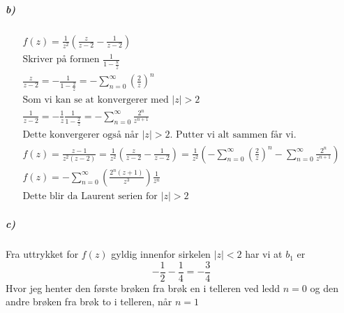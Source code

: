 \documentclass[11pt, A4paper,norsk]{article}
\begin{document}
			\subparagraph{b)}
				\begin{gather*}
f(z) = \frac{1}{z^2}\left( \frac{z}{z - 2} - \frac{1}{z - 2} \right) \\
\text{Skriver på formen $\frac{1}{1 - \frac{k}{z}}$} \\
\frac{z}{z - 2} = - \frac{1}{1 - \frac{2}{z}} = - \sum_{n = 0}^{\infty} \left( \frac{2}{z} \right)^n \\
\text{Som vi kan se at konvergerer med $|z| > 2$} \\
\frac{1}{z - 2} = - \frac{1}{z} \frac{1}{1 - \frac{2}{z}} = - \sum_{n = 0}^{\infty} \frac{2^{n}}{z^{n + 1}} \\
\text{Dette konvergerer også når $|z| > 2$. Putter vi alt sammen får vi.} \\
f(z) = \frac{z - 1}{z^2(z - 2)} = \frac{1}{z^2} \left( \frac{z}{z - 2} - \frac{1}{z - 2} \right) = \frac{1}{z^2} \left( - \sum_{n = 0}^{\infty} \left( \frac{2}{z} \right)^n - \sum_{n = 0}^{\infty} \frac{2^n}{z^{n + 1}} \right) \\
f(z) = - \sum_{n = 0}^{\infty} \left( \frac{2^n(z + 1)}{z^3} \right)\frac{1}{z^n} \\
\text{Dette blir da Laurent serien for $|z| > 2$}
				\end{gather*}









			\subparagraph{c)}
				\begin{flushleft}
Fra uttrykket for $f(z)$ gyldig innenfor sirkelen $|z| < 2$ har vi at $b_1$ er 
$$- \frac{1}{2} - \frac{1}{4} = - \frac{3}{4}$$
Hvor jeg henter den første brøken fra brøk en i telleren ved ledd $n = 0$ og den andre brøken fra brøk to i telleren, når $n = 1$
				\end{flushleft}
\end{document}
